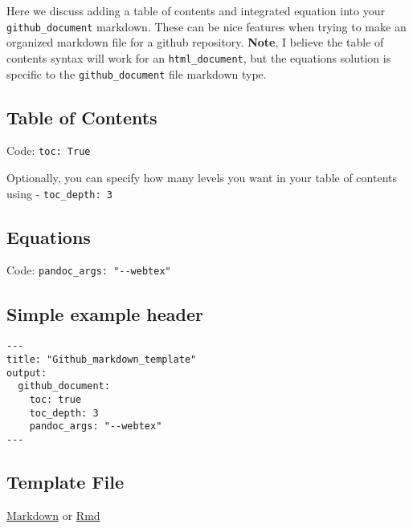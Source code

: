 \documentclass[
  letterpaper,
  DIV=11,
  numbers=noendperiod]{scrreprt}
\begin{document}
Here we discuss adding a table of contents and integrated equation into
your \texttt{github\_document} markdown. These can be nice features when
trying to make an organized markdown file for a github repository.
\textbf{Note}, I believe the table of contents syntax will work for an
\texttt{html\_document}, but the equations solution is specific to the
\texttt{github\_document} file markdown type.

\hypertarget{table-of-contents-2}{%
\subsection*{\texorpdfstring{\textbf{Table of
Contents}}{Table of Contents}}\label{table-of-contents-2}}

Code: \texttt{toc:\ True}

Optionally, you can specify how many levels you want in your table of
contents using - \texttt{toc\_depth:\ 3}

\hypertarget{equations}{%
\subsection*{\texorpdfstring{\textbf{Equations}}{Equations}}\label{equations}}

Code: \texttt{pandoc\_args:\ "-\/-webtex"}

\hypertarget{simple-example-header}{%
\subsection*{\texorpdfstring{\textbf{Simple example
header}}{Simple example header}}\label{simple-example-header}}

\begin{verbatim}
---
title: "Github_markdown_template"
output: 
  github_document:
    toc: true
    toc_depth: 3
    pandoc_args: "--webtex"
---
\end{verbatim}

\hypertarget{template-file}{%
\subsection*{\texorpdfstring{\textbf{Template
File}}{Template File}}\label{template-file}}

\href{https://github.com/DrK-Lo/lotterhoslabprotocols/blob/gh-pages/_data/github_markdown_template.md}{Markdown}
or
\href{https://github.com/DrK-Lo/lotterhoslabprotocols/blob/gh-pages/_data/github_markdown_template.Rmd}{Rmd}
\end{document}
